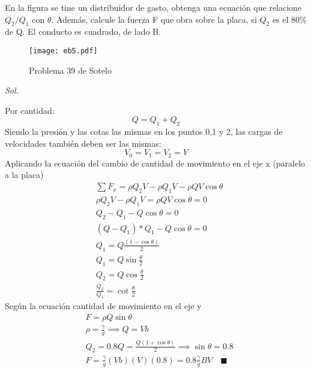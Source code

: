 \begin{problem}
    En la figura se tine un distribuidor de gasto, obtenga una ecuación que relacione $Q_2/Q_1$ con $\theta$. Además, calcule la fuerza F que obra sobre la placa, si $Q_2$ es el 80\% de Q. El conducto es cuadrado, de lado B.
\end{problem}
\begin{figure}[h!]
        \centering
          \texttt{[image: eb5.pdf]}
          \caption{Problema 39 de Sotelo}
          \label{eb5}
\end{figure}
\textit{ Sol. }

Por cantidad:
\begin{equation}
    Q=Q_1+Q_2
\end{equation}
Siendo la presión y las cotas las mismas en los puntos 0,1 y 2, las cargas de velocidades también deben ser las mismas:
\begin{equation}
    V_0=V_1=V_2=V
\end{equation}
Aplicando la ecuación del cambio de cantidad de movimiento en el eje x (paralelo a la placa)
\begin{align*}
    &\sum F_x=\rho Q_2V-\rho Q_1V-\rho QV\cos{\theta}\\
    &\rho Q_2 V-\rho Q_1V=\rho QV\cos{\theta}=0\\
    &Q_2-Q_1-Q\cos{\theta}=0\\
    &\left(Q-Q_1\right)*Q_1-Q\cos{\theta}=0\\
    &Q_1=Q\frac{\left(1-\cos{\theta}\right)}{2}\\
    &Q_1=Q\sin{\frac{\theta}{2}}\\
    &Q_2=Q\cos{\frac{\theta}{2}}\\
    &\frac{Q_2}{Q_1}=\cot{\frac{\theta}{2}}
\end{align*}
Según la ecuación cantidad de movimiento en el eje y
\begin{align*}
    &F=\rho Q\sin{\theta}\\
    &\rho=\frac{\gamma}{g}\implies Q=Vb\\
    &Q_2=0.8Q=\frac{Q\left(1+\cos{\theta}\right)}{2}\implies \sin{\theta}=0.8\\
    &F=\frac{\gamma}{g}\left(Vb\right)(V)(0.8)=0.8\frac{\gamma}{g}BV\quad\blacksquare
\end{align*}











